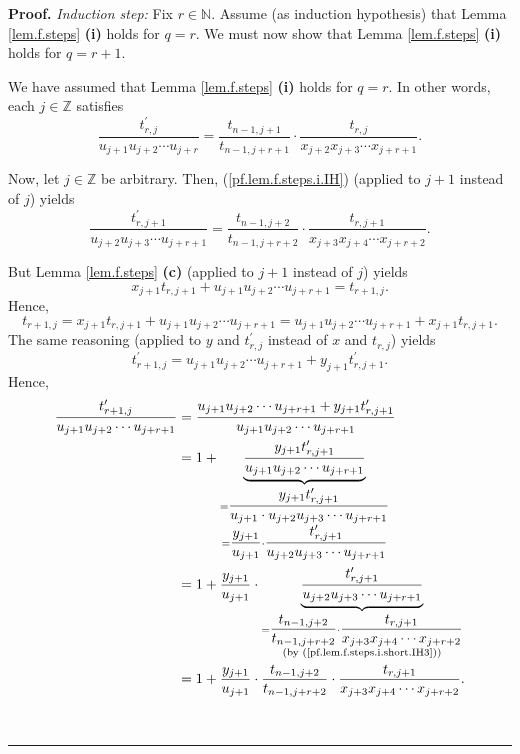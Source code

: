 \documentclass[numbers=enddot,12pt,final,onecolumn,notitlepage]{scrartcl}%
\theoremstyle{definition}
\newenvironment{proof}[1][Proof]{\noindent\textbf{#1.} }{\ \rule{0.5em}{0.5em}}
\newenvironment{vershort}{}{}
\begin{document}
\begin{proof}
\textit{Induction step:} Fix $r\in\mathbb{N}$. Assume (as induction
hypothesis) that Lemma \ref{lem.f.steps} \textbf{(i)} holds for $q=r$. We must
now show that Lemma \ref{lem.f.steps} \textbf{(i)} holds for $q=r+1$.

We have assumed that Lemma \ref{lem.f.steps} \textbf{(i)} holds for $q=r$. In
other words, each $j\in\mathbb{Z}$ satisfies%
\begin{equation}
\dfrac{t_{r,j}^{\prime}}{u_{j+1}u_{j+2}\cdots u_{j+r}}=\dfrac{t_{n-1,j+1}%
}{t_{n-1,j+r+1}}\cdot\dfrac{t_{r,j}}{x_{j+2}x_{j+3}\cdots x_{j+r+1}}.
\label{pf.lem.f.steps.i.IH}%
\end{equation}


\begin{vershort}
Now, let $j\in\mathbb{Z}$ be arbitrary. Then, (\ref{pf.lem.f.steps.i.IH})
(applied to $j+1$ instead of $j$) yields%
\begin{equation}
\dfrac{t_{r,j+1}^{\prime}}{u_{j+2}u_{j+3}\cdots u_{j+r+1}}=\dfrac{t_{n-1,j+2}%
}{t_{n-1,j+r+2}}\cdot\dfrac{t_{r,j+1}}{x_{j+3}x_{j+4}\cdots x_{j+r+2}}.
\label{pf.lem.f.steps.i.short.IH3}%
\end{equation}


But Lemma \ref{lem.f.steps} \textbf{(c)} (applied to $j+1$ instead of $j$)
yields%
\[
x_{j+1}t_{r,j+1}+u_{j+1}u_{j+2}\cdots u_{j+r+1}=t_{r+1,j}.
\]
Hence,%
\[
t_{r+1,j}=x_{j+1}t_{r,j+1}+u_{j+1}u_{j+2}\cdots u_{j+r+1}=u_{j+1}u_{j+2}\cdots
u_{j+r+1}+x_{j+1}t_{r,j+1}.
\]
The same reasoning (applied to $y$ and $t_{r,j}^{\prime}$ instead of $x$ and
$t_{r,j}$) yields
\[
t_{r+1,j}^{\prime}=u_{j+1}u_{j+2}\cdots u_{j+r+1}+y_{j+1}t_{r,j+1}^{\prime}.
\]
Hence,%
\begin{align}
\dfrac{t_{r+1,j}^{\prime}}{u_{j+1}u_{j+2}\cdots u_{j+r+1}}  &  =\dfrac
{u_{j+1}u_{j+2}\cdots u_{j+r+1}+y_{j+1}t_{r,j+1}^{\prime}}{u_{j+1}%
u_{j+2}\cdots u_{j+r+1}}\nonumber\\
&  =1+\underbrace{\dfrac{y_{j+1}t_{r,j+1}^{\prime}}{u_{j+1}u_{j+2}\cdots
u_{j+r+1}}}_{\substack{=\dfrac{y_{j+1}t_{r,j+1}^{\prime}}{u_{j+1}\cdot
u_{j+2}u_{j+3}\cdots u_{j+r+1}}\\=\dfrac{y_{j+1}}{u_{j+1}}\cdot\dfrac
{t_{r,j+1}^{\prime}}{u_{j+2}u_{j+3}\cdots u_{j+r+1}}}}\nonumber\\
&  =1+\dfrac{y_{j+1}}{u_{j+1}}\cdot\underbrace{\dfrac{t_{r,j+1}^{\prime}%
}{u_{j+2}u_{j+3}\cdots u_{j+r+1}}}_{\substack{=\dfrac{t_{n-1,j+2}%
}{t_{n-1,j+r+2}}\cdot\dfrac{t_{r,j+1}}{x_{j+3}x_{j+4}\cdots x_{j+r+2}%
}\\\text{(by (\ref{pf.lem.f.steps.i.short.IH3}))}}}\nonumber\\
&  =1+\dfrac{y_{j+1}}{u_{j+1}}\cdot\dfrac{t_{n-1,j+2}}{t_{n-1,j+r+2}}%
\cdot\dfrac{t_{r,j+1}}{x_{j+3}x_{j+4}\cdots x_{j+r+2}}.
\label{pf.lem.f.steps.i.short.3}%
\end{align}



\end{vershort}
\end{proof}
\end{document}
